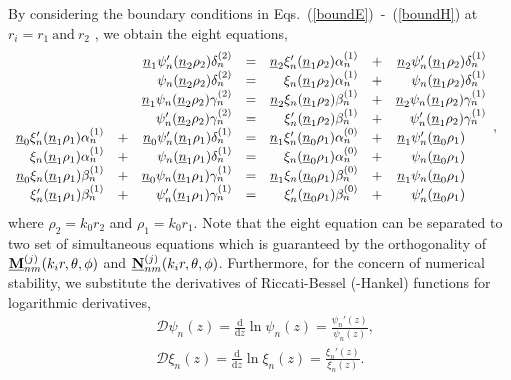 \documentclass[journal=jacsat,manuscript=article,layout=traditional]{achemso}
\newcommand{\norF}[1]{\underline{\vb{#1}}}
\newcommand{\nr}{\underline{n}}
\begin{document}
By considering the boundary conditions in Eqs.~(\ref{boundE})~-~(\ref{boundH}) at $r_i=r_1~\mathrm{and}~r_2$ , we obtain the eight equations,
\begin{align}
    &\begin{array}{rlrlrlr}
     & & \nr_1\psi_n'(\nr_2\rho_2)\delta_n^{(2)} &=& 
    \nr_2\xi_n'(\nr_1\rho_2)\alpha_n^{(1)} & + & \nr_2\psi_n'(\nr_1\rho_2)\delta_n^{(1)}\\
     & & \psi_n(\nr_2\rho_2)\delta_n^{(2)} &=& 
    \xi_n(\nr_1\rho_2)\alpha_n^{(1)} &+& \psi_n(\nr_1\rho_2)\delta_n^{(1)}\\
     & & \nr_1\psi_n(\nr_2\rho_2)\gamma_n^{(2)} &=& 
    \nr_2\xi_n(\nr_1\rho_2)\beta_n^{(1)} &+& \nr_2\psi_n(\nr_1\rho_2)\gamma_n^{(1)}\\
     & & \psi_n'(\nr_2\rho_2)\gamma_n^{(2)} &=& 
    \xi_n'(\nr_1\rho_2)\beta_n^{(1)} &+& \psi_n'(\nr_1\rho_2)\gamma_n^{(1)}\\
    \nr_0\xi_n'(\nr_1\rho_1)\alpha_n^{(1)} &+& \nr_0\psi_n'(\nr_1\rho_1)\delta_n^{(1)} &=& 
    \nr_1\xi_n'(\nr_0\rho_1)\alpha_n^{(0)} &+& \nr_1\psi_n'(\nr_0\rho_1)\hphantom{\delta_n^{(1)}}\\
    \xi_n(\nr_1\rho_1)\alpha_n^{(1)} &+& \psi_n(\nr_1\rho_1)\delta_n^{(1)} &=& 
    \xi_n(\nr_0\rho_1)\alpha_n^{(0)} &+& \psi_n(\nr_0\rho_1)\hphantom{\delta_n^{(1)}}\\
    \nr_0\xi_n(\nr_1\rho_1)\beta_n^{(1)} &+& \nr_0\psi_n(\nr_1\rho_1)\gamma_n^{(1)} &=& 
    \nr_1\xi_n(\nr_0\rho_1)\beta_n^{(0)} &+& \nr_1\psi_n(\nr_0\rho_1)\hphantom{\delta_n^{(1)}}\\
    \xi_n'(\nr_1\rho_1)\beta_n^{(1)} &+& \psi_n'(\nr_1\rho_1)\gamma_n^{(1)} &=& 
    \xi_n'(\nr_0\rho_1)\beta_n^{(0)} &+& \psi_n'(\nr_0\rho_1)\hphantom{\delta_n^{(1)}}
    \end{array},
\end{align}
where $\rho_2=k_0r_2$ and $\rho_1=k_0r_1$.
Note that the eight equation can be separated to two set of simultaneous equations which is guaranteed by the orthogonality of $\norF{M}_{nm}^{(j)}(k_ir,\theta,\phi)$ and $\norF{N}_{nm}^{(j)}(k_ir,\theta,\phi)$.
Furthermore, for the concern of numerical stability, we substitute the derivatives of Riccati-Bessel (-Hankel) functions for logarithmic derivatives,
\begin{subequations}
    \begin{align}
        &\mathcal{D}\psi_n(z) = \frac{\mathrm{d}}{\mathrm{d}z}\ln{\psi_n(z)} = \frac{\psi_n'(z)}{\psi_n(z)},\\
        &\mathcal{D}\xi_n(z) = \frac{\mathrm{d}}{\mathrm{d}z}\ln{\xi_n(z)} = \frac{\xi_n'(z)}{\xi_n(z)}.
    \end{align}%
\end{subequations}
\end{document}
